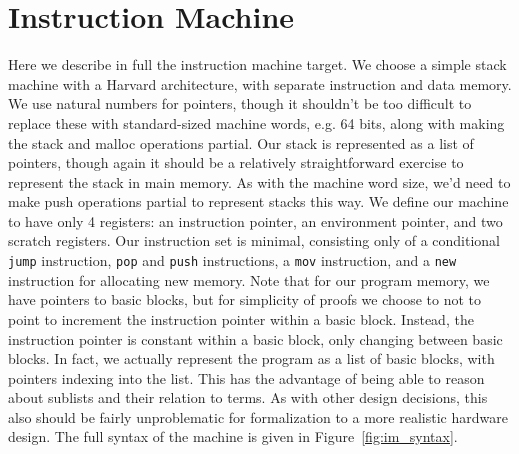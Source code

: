 \section{Instruction Machine}

Here we describe in full the instruction machine target. We choose a simple
stack machine with a Harvard architecture, with separate instruction and
data memory. We use natural numbers for pointers, though it shouldn't be too
difficult to replace these with standard-sized machine words, e.g. 64 bits,
along with making the stack and malloc operations partial. Our stack is
represented as a list of pointers, though again it should be a relatively
straightforward exercise to represent the stack in main memory. As with the
machine word size, we'd need to make push operations partial to represent stacks
this way. We define our machine to have only 4 registers: an instruction
pointer, an environment pointer, and two scratch registers. Our instruction set
is minimal, consisting only of a conditional \texttt{jump} instruction,
\texttt{pop} and \texttt{push} instructions, a \texttt{mov} instruction, and a
\texttt{new} instruction for allocating new memory. Note that for our program
memory, we have pointers to basic blocks, but for simplicity of proofs we choose
to not to point to increment the instruction pointer within a basic block.
Instead, the instruction pointer is constant within a basic block, only
changing between basic blocks. In fact, we actually represent the program as a
list of basic blocks, with pointers indexing into the list. This has the
advantage of being able to reason about sublists and their relation to terms. As
with other design decisions, this also should be fairly unproblematic for
formalization to a more realistic hardware design. The full syntax of the
machine is given in Figure~\ref{fig:im_syntax}.  


